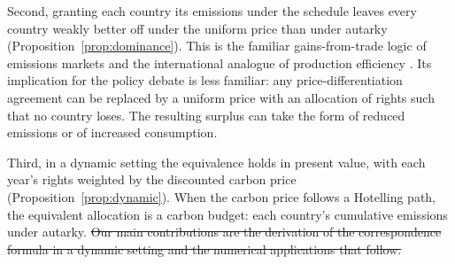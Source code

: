 \documentclass[12pt,english]{article}
\theoremstyle{remark}
\providecommand{\DIFdeltex}[1]{{\protect\color{red}\sout{#1}}}                      %
\providecommand{\DIFdelbegin}{} %
\providecommand{\DIFdelend}{} %
\providecommand{\DIFdel}[1]{\texorpdfstring{\DIFdeltex{#1}}{}} %
\newcommand{\DIFscaledelfig}{0.5}
\newlength{\DIFdelgraphicswidth} %
\newlength{\DIFdelgraphicsheight} %
\newcommand{\DIFdelincludegraphics}[2][]{%
\sbox{\DIFdelgraphicsbox}{\DIFOincludegraphics[#1]{#2}}%
\settoboxwidth{\DIFdelgraphicswidth}{\DIFdelgraphicsbox} %
\settoboxtotalheight{\DIFdelgraphicsheight}{\DIFdelgraphicsbox} %
\scalebox{\DIFscaledelfig}{%
\parbox[b]{\DIFdelgraphicswidth}{\usebox{\DIFdelgraphicsbox}\\[-\baselineskip] \rule{\DIFdelgraphicswidth}{0em}}\llap{\resizebox{\DIFdelgraphicswidth}{\DIFdelgraphicsheight}{%
\setlength{\unitlength}{\DIFdelgraphicswidth}%
\begin{picture}(1,1)%
\thicklines\linethickness{2pt} %
{\color[rgb]{1,0,0}\put(0,0){\framebox(1,1){}}}%
{\color[rgb]{1,0,0}\put(0,0){\line( 1,1){1}}}%
{\color[rgb]{1,0,0}\put(0,1){\line(1,-1){1}}}%
\end{picture}%
}\hspace*{3pt}}} %
} %
\DeclareRobustCommand{\DIFdelbegin}{\DIFOdelbegin \let\includegraphics\DIFdelincludegraphics} %
\DeclareRobustCommand{\DIFdelend}{\DIFOaddend \let\includegraphics\DIFOincludegraphics} %
\begin{document}
Second, granting each country its emissions under the schedule leaves every country weakly better off under the uniform price than under autarky (Proposition~\ref{prop:dominance}). This is the familiar gains-from-trade logic of emissions markets \citep{montgomery_markets_1972} and the international analogue of production efficiency \citep{diamond_optimal_1971}. Its implication for the policy debate is less familiar: any price-differentiation agreement can be replaced by a uniform price with an allocation of rights such that no country loses. The resulting surplus can take the form of reduced emissions or of increased consumption.

Third, in a dynamic setting the equivalence holds in present value, with each year's rights weighted by the discounted carbon price (Proposition~\ref{prop:dynamic}). When the carbon price follows a Hotelling path, the equivalent allocation is a carbon budget: each country's cumulative emissions under autarky. \DIFdelbegin \DIFdel{Our main contributions are the derivation of the correspondence formula in a dynamic setting and the numerical applications that follow.
}\DIFdelend %
\end{document}
